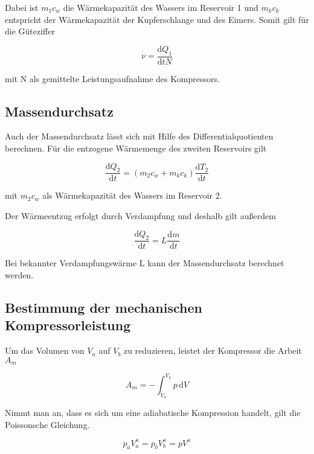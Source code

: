 Dabei ist $m_{1} c_w$ die Wärmekapazität des Wassers im Reservoir 1 und $m_k c_k$ entspricht der Wärmekapazität der Kupferschlange und des Eimers. Somit gilt für die Güteziffer

\begin{equation}
\label{eqn:güteziffer2}
ν = \frac{\mathrm{d}Q_{1}}{\mathrm{d}t N}
\end{equation}

mit N als gemittelte Leistungsaufnahme des Kompressors.

\subsection{Massendurchsatz}
Auch der Massendurchsatz lässt sich mit Hilfe des Differentialquotienten berechnen. Für die entzogene Wärmemenge des zweiten Reservoirs gilt

\begin{equation}
\label{eqn:durchsatz1}
\frac{\mathrm{d}Q_{2}}{\mathrm{d}t} = (m_2 c_w + m_kc_k)\frac{\mathrm{d}T_{2}}{\mathrm{d}t}
\end{equation}

mit $m_{2} c_w$ als Wärmekapazität des Wassers im Reservoir 2.

Der Wärmeentzug erfolgt durch Verdampfung und deshalb gilt außerdem

\begin{equation}
\label{eqn:durchsatz2}
\frac{\mathrm{d}Q_{2}}{\mathrm{d}t} = L\frac{\mathrm{d}m}{\mathrm{d}t}
\end{equation}

Bei bekannter Verdampfungswärme L kann der Massendurchsatz berechnet werden.

\subsection{Bestimmung der mechanischen Kompressorleistung}
Um das Volumen von $V_a$ auf $V_b$ zu reduzieren, leistet der Kompressor die Arbeit $A_m$

\begin{equation}
A_m = - \int_{V_a}^{V_b} p \, \mathrm{d}V
\end{equation}

Nimmt man an, dass es sich um eine adiabatische Kompression handelt, gilt die Poissonsche Gleichung.

\begin{equation}
p_a V_a^{\kappa} = p_b V_b^{\kappa} = pV^{\kappa}
\end{equation}

